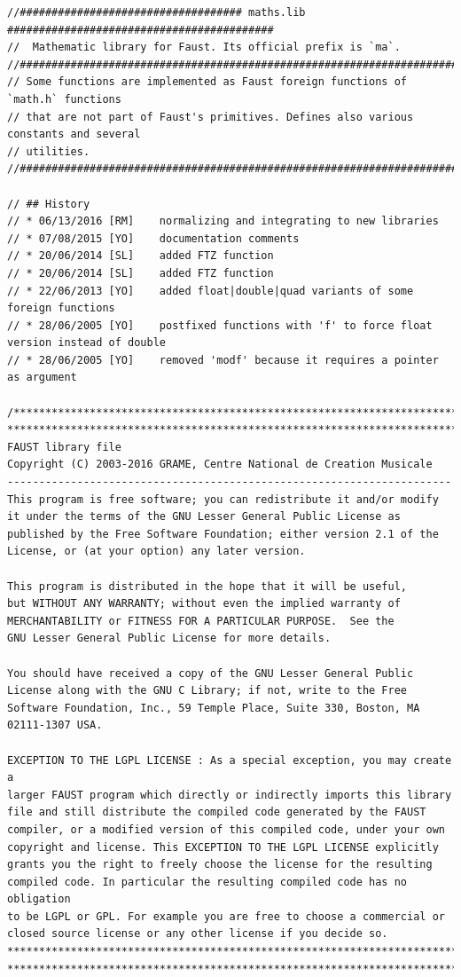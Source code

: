 \documentclass{article}
\begin{document}
\bigskip\bigskip
\begin{lstlisting}[caption=\texttt{maths.lib}]
//################################### maths.lib ##########################################
//  Mathematic library for Faust. Its official prefix is `ma`.
//########################################################################################
// Some functions are implemented as Faust foreign functions of `math.h` functions
// that are not part of Faust's primitives. Defines also various constants and several
// utilities.
//########################################################################################

// ## History
// * 06/13/2016 [RM]	normalizing and integrating to new libraries
// * 07/08/2015	[YO]	documentation comments
// * 20/06/2014	[SL]	added FTZ function
// * 20/06/2014	[SL]	added FTZ function
// * 22/06/2013	[YO]	added float|double|quad variants of some foreign functions
// * 28/06/2005	[YO]	postfixed functions with 'f' to force float version instead of double
// * 28/06/2005	[YO]	removed 'modf' because it requires a pointer as argument

/************************************************************************
************************************************************************
FAUST library file
Copyright (C) 2003-2016 GRAME, Centre National de Creation Musicale
----------------------------------------------------------------------
This program is free software; you can redistribute it and/or modify
it under the terms of the GNU Lesser General Public License as
published by the Free Software Foundation; either version 2.1 of the
License, or (at your option) any later version.

This program is distributed in the hope that it will be useful,
but WITHOUT ANY WARRANTY; without even the implied warranty of
MERCHANTABILITY or FITNESS FOR A PARTICULAR PURPOSE.  See the
GNU Lesser General Public License for more details.

You should have received a copy of the GNU Lesser General Public
License along with the GNU C Library; if not, write to the Free
Software Foundation, Inc., 59 Temple Place, Suite 330, Boston, MA
02111-1307 USA.

EXCEPTION TO THE LGPL LICENSE : As a special exception, you may create a
larger FAUST program which directly or indirectly imports this library
file and still distribute the compiled code generated by the FAUST
compiler, or a modified version of this compiled code, under your own
copyright and license. This EXCEPTION TO THE LGPL LICENSE explicitly
grants you the right to freely choose the license for the resulting
compiled code. In particular the resulting compiled code has no obligation
to be LGPL or GPL. For example you are free to choose a commercial or
closed source license or any other license if you decide so.
************************************************************************
************************************************************************/


\end{lstlisting}
\end{document}
